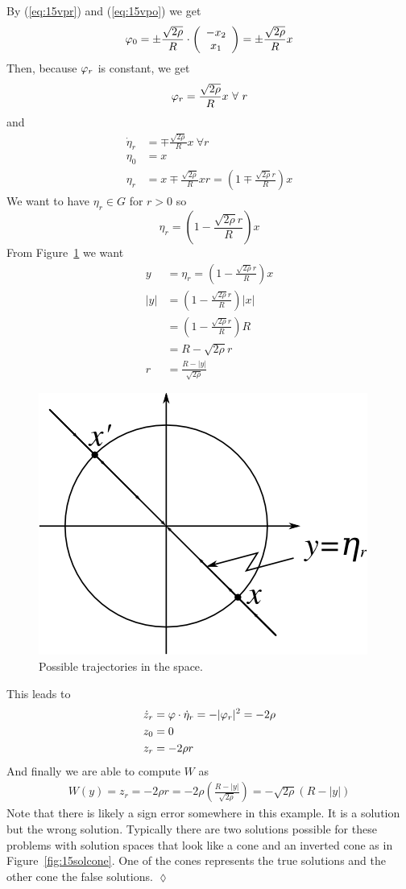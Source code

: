 \begin{example}
By (\ref{eq:15vpr}) and (\ref{eq:15vpo}) we get
$$\varphi_0 = \pm\frac{\sqrt{2\rho}}{R}\cdot\left(\begin{array}{c} -x_2 \\ x_1 \end{array}\right) = \pm\frac{\sqrt{2\rho}}{R}x$$
Then, because $\varphi_r$ is constant, we get
$$\varphi_r = \frac{\sqrt{2\rho}}{R}x~\forall~r$$
and
\begin{align*}
\dot{\eta}_r &= \mp \frac{\sqrt{2\rho}}{R}x~\forall r \\
\eta_0 &= x \\
\eta_r &= x\mp\frac{\sqrt{2\rho}}{R}xr = \left(1\mp\frac{\sqrt{2\rho}r}{R}\right)x
\end{align*}
We want to have $\eta_r\in G$ for $r>0$ so
$$\eta_r = \left(1-\frac{\sqrt{2\rho}r}{R}\right)x$$
From Figure~\ref{fig:15traj} we want
\begin{align*}
y &= \eta_r = \left(1-\frac{\sqrt{2\rho}r}{R}\right)x \\
|y| &= \left(1-\frac{\sqrt{2\rho}r}{R}\right)|x| \\
&= \left(1-\frac{\sqrt{2\rho}r}{R}\right)R \\
&= R-\sqrt{2\rho}r \\
r &= \frac{R-|y|}{\sqrt{2\rho}}
\end{align*}

\begin{figure}[ht!]
\centering
\includegraphics[width=.4\textwidth]{images/15traj}
\caption{Possible trajectories in the space.}
\label{fig:15traj}
\end{figure}

This leads to
\begin{align*}
\dot{z}_r &= \varphi\cdot\dot{\eta}_r = -|\varphi_r|^2 = -2\rho \\
z_0 &= 0 \\
z_r &= -2\rho r
\end{align*}
And finally we are able to compute $W$ as
\begin{align*}
\boxed{W(y) = z_r = -2\rho r = -2\rho\left(\frac{R-|y|}{\sqrt{2\rho}}\right) = -\sqrt{2\rho}(R-|y|)}
\end{align*}
Note that there is likely a sign error somewhere in this example.
It is a solution but the wrong solution.
Typically there are two solutions possible for these problems with solution spaces that look like a cone and an inverted cone as in Figure~\ref{fig:15solcone}.
One of the cones represents the true solutions and the other cone the false solutions.
$\lozenge$
\end{example}

